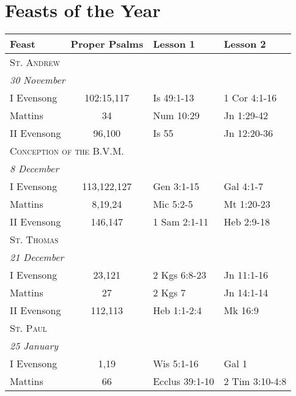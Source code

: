 \section{Feasts of the Year}
\begin{longtable}{l c l l}
\multicolumn{1}{l}{Feast}&\multicolumn{1}{l}{Proper Psalms}&\multicolumn{1}{l}{Lesson 1}& \multicolumn{1}{l}{Lesson 2}\\
\hline
\endhead
\multicolumn{4}{l}{\textsc{St. Andrew}}\\
\multicolumn{4}{l}{\textit{30 November}}\\
\hspace{1em} I Evensong&102:15,117&Is 49:1-13&1 Cor 4:1-16\\
\hspace{1em} Mattins&34&Num 10:29&Jn 1:29-42\\
\hspace{1em} II Evensong&96,100&Is 55&Jn 12:20-36\\
\multicolumn{4}{l}{\textsc{Conception of the B.V.M.}}\\
\multicolumn{4}{l}{\textit{8 December}}\\
\hspace{1em} I Evensong&113,122,127&Gen 3:1-15&Gal 4:1-7\\
\hspace{1em} Mattins&8,19,24&Mic 5:2-5&Mt 1:20-23\\
\hspace{1em} II Evensong&146,147&1 Sam 2:1-11&Heb 2:9-18\\
\multicolumn{4}{l}{\textsc{St. Thomas}}\\
\multicolumn{4}{l}{\textit{21 December}}\\
\hspace{1em} I Evensong&23,121&2 Kgs 6:8-23&Jn 11:1-16\\
\hspace{1em} Mattins&27&2 Kgs 7&Jn 14:1-14\\
\hspace{1em} II Evensong&112,113&Heb 1:1-2:4&Mk 16:9\\
\multicolumn{4}{l}{\textsc{St. Paul}}\\
\multicolumn{4}{l}{\textit{25 January}}\\
\hspace{1em} I Evensong&1,19&Wis 5:1-16&Gal 1\\
\hspace{1em} Mattins&66&Ecclus 39:1-10&2 Tim 3:10-4:8\\

\end{longtable}
